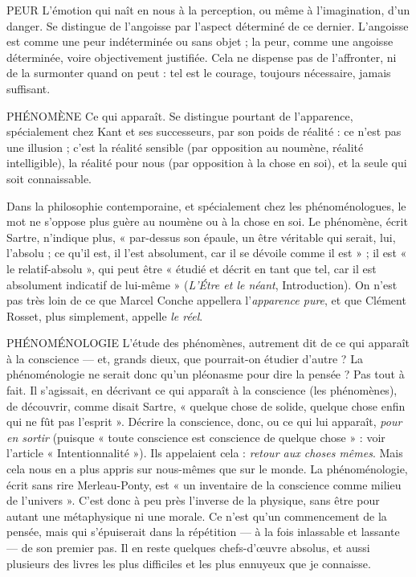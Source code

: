 PEUR  L’émotion qui naît en nous à la perception, ou même à l’imagination,
d’un danger. Se distingue de l’angoisse par l’aspect déterminé
de ce dernier. L’angoisse est comme une peur indéterminée ou sans objet ; la
peur, comme une angoisse déterminée, voire objectivement justifiée. Cela ne
dispense pas de l’affronter, ni de la surmonter quand on peut : tel est le courage,
toujours nécessaire, jamais suffisant.

PHÉNOMÈNE Ce qui apparaît. Se distingue pourtant de l'apparence, spécialement
chez Kant et ses successeurs, par son poids de
réalité : ce n’est pas une illusion ; c’est la réalité sensible (par opposition au
noumène, réalité intelligible), la réalité pour nous (par opposition à la chose en
soi), et la seule qui soit connaissable.

Dans la philosophie contemporaine, et spécialement chez les phénoménologues,
le mot ne s’oppose plus guère au noumène ou à la chose en soi. Le phénomène,
écrit Sartre, n'indique plus, « par-dessus son épaule, un être véritable
qui serait, lui, l’absolu ; ce qu’il est, il l’est absolument, car il se dévoile comme
il est » ; il est « le relatif-absolu », qui peut être « étudié et décrit en tant que tel,
car il est absolument indicatif de lui-même » ({\it L'Étre et le néant}, Introduction).
On n’est pas très loin de ce que Marcel Conche appellera l'{\it apparence pure}, et
que Clément Rosset, plus simplement, appelle {\it le réel}.

PHÉNOMÉNOLOGIE L'étude des phénomènes, autrement dit de ce qui
apparaît à la conscience — et, grands dieux, que
pourrait-on étudier d’autre ? La phénoménologie ne serait donc qu’un pléonasme
pour dire la pensée ? Pas tout à fait. Il s’agissait, en décrivant ce qui
apparaît à la conscience (les phénomènes), de découvrir, comme disait Sartre,
« quelque chose de solide, quelque chose enfin qui ne fût pas l'esprit ». Décrire
la conscience, donc, ou ce qui lui apparaît, {\it pour en sortir} (puisque « toute conscience
est conscience de quelque chose » : voir l’article « Intentionnalité »). Ils
appelaient cela : {\it retour aux choses mêmes}. Mais cela nous en a plus appris sur
nous-mêmes que sur le monde. La phénoménologie, écrit sans rire Merleau-Ponty,
est « un inventaire de la conscience comme milieu de l'univers ». C’est
donc à peu près l'inverse de la physique, sans être pour autant une métaphysique
ni une morale. Ce n’est qu’un commencement de la pensée, mais qui
s’épuiserait dans la répétition — à la fois inlassable et lassante — de son premier
pas. Il en reste quelques chefs-d’œuvre absolus, et aussi plusieurs des livres les
plus difficiles et les plus ennuyeux que je connaisse.

